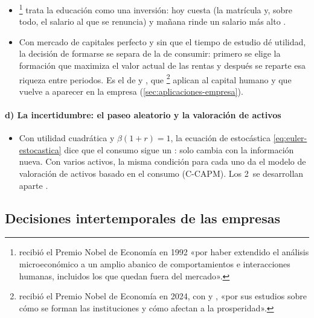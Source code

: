 \documentclass[11pt]{article}
\begin{document}
\begin{itemize}
\item \textcite{Becker1962Investment}\footnote{ recibió el Premio Nobel de Economía en 1992 «por haber extendido el análisis microeconómico a un amplio abanico de comportamientos e interacciones humanas, incluidos los que quedan fuera del mercado»\nocite{Nobel1992Becker}.} trata la educación como una inversión: hoy cuesta (la matrícula y, sobre todo, el salario al que se renuncia) y mañana rinde un salario más alto .
\item Con mercado de capitales perfecto y sin que el tiempo de estudio dé utilidad, la decisión de formarse se separa de la de consumir: primero se elige la formación que maximiza el valor actual de las rentas y después se reparte esa riqueza entre periodos. Es el  de \textcite{Fisher1930Theory} y \textcite{Hirshleifer1958Optimal}, que \textcite{AcemogluAutor2011Lectures}\footnote{ recibió el Premio Nobel de Economía en 2024, con  y , «por sus estudios sobre cómo se forman las instituciones y cómo afectan a la prosperidad»\nocite{NobelPrize2024}.} aplican al capital humano y que vuelve a aparecer en la empresa (\ref{sec:aplicaciones-empresa}).
\end{itemize}

\paragraph{d) La incertidumbre: el paseo aleatorio y la valoración de activos}

\begin{itemize}
\item Con utilidad cuadrática y $\beta(1+r)=1$, la ecuación de  estocástica \eqref{eq:euler-estocastica} dice que el consumo sigue un : solo cambia con la información nueva\nocite{Hall1978}. Con varios activos, la misma condición para cada uno da el modelo de valoración de activos basado en el consumo (C-CAPM)\nocite{Lucas1978Asset,Breeden1979Intertemporal}. Los 2~se desarrollan aparte .
\end{itemize}

\subsection{Decisiones intertemporales de las empresas}\label{sec:empresas}
\end{document}
